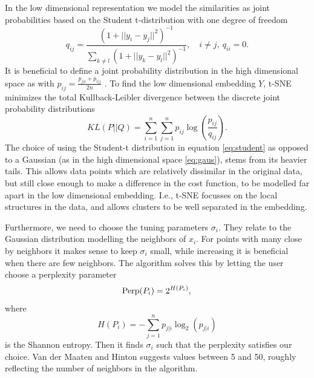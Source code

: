 \documentclass[a4paper]{memoir}
\theoremstyle{plain}
\theoremstyle{definition}
\theoremstyle{remark}
\begin{document}
In the low dimensional representation we model the similarities as joint probabilities based on the Student t-distribution with one degree of freedom
\begin{equation}\label{eq:student}
        q_{ij} = \frac{(1 + ||y_i - y_j||^2)^{-1}}{\sum_{k \neq  l}^{}(1 + ||y_k - y_l||^2)^{-1}}, \quad i \neq  j, \ q_{ii} = 0.
\end{equation}
It is beneficial to define a joint probability distribution in the high dimensional space as with $p_{ij}= \frac{p_{j|i} + p_{i|j}}{2n}$ \cite{hinton}.
To find the low dimensional embedding $Y$, t-SNE minimizes the total Kullback-Leibler divergence between the discrete joint probability distributions 
\begin{equation}\label{eq:KL}
        KL(P||Q) = \sum_{i = 1}^{n}\sum_{j = 1}^{n} p_{ij}\log \left( \frac{p_{ij}}{q_{ij}} \right).
\end{equation}
The choice of using the Student-t distribution in equation \eqref{eq:student} as opposed to a Gaussian (as in the high dimensional space \eqref{eq:gaus}), stems from its heavier tails.
This allows data points which are relatively dissimilar in the original data, but still close enough to make a difference in the cost function, to be modelled far apart in the low dimensional embedding.
I.e., t-SNE focusses on the local structures in the data, and allows clusters to be well separated in the embedding.

Furthermore, we need to choose the tuning parameters $\sigma_i$.
They relate to the Gaussian distribution modelling the neighbors of $x_i$.
For points with many close by neighbors it makes sense to keep $\sigma_i$ small, while increasing it is beneficial when there are few neighbors.
The algorithm solves this by letting the user choose a perplexity parameter
\begin{equation}\label{eq:perp}
        \text{Perp}(P_i) = 2^{H(P_i)}, \\
\end{equation}
where 
\begin{equation*}
        H(P_i) = -\sum_{j = 1}^{n} p_{j|i}\log_2(p_{j|i})
\end{equation*}
is the Shannon entropy.
Then it finds $\sigma_i$ such that the perplexity satisfies our choice.
Van der Maaten and Hinton \cite{hinton} suggests values between 5 and 50, roughly reflecting the number of neighbors in the algorithm.
\end{document}
